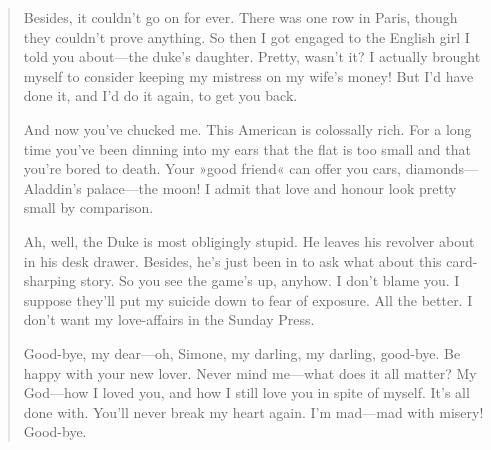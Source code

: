 \begin{quotation}
Besides, it couldn't go on for ever. There was one row in Paris, though they couldn't prove anything. So then I got engaged to the English girl I told you about—the duke's daughter. Pretty, wasn't it? I actually brought myself to consider keeping my mistress on my wife's money! But I'd have done it, and I'd do it again, to get you back.

And now you've chucked me. This American is colossally rich. For a long time you've been dinning into my ears that the flat is too small and that you're bored to death. Your »good friend« can offer you cars, diamonds—Aladdin's palace—the moon! I admit that love and honour look pretty small by comparison.

Ah, well, the Duke is most obligingly stupid. He leaves his revolver about in his desk drawer. Besides, he's just been in to ask what about this card-sharping story. So you see the game's up, anyhow. I don't blame you. I suppose they'll put my suicide down to fear of exposure. All the better. I don't want my love-affairs in the Sunday Press.

Good-bye, my dear—oh, Simone, my darling, my darling, good-bye. Be happy with your new lover. Never mind me—what does it all matter? My God—how I loved you, and how I still love you in spite of myself. It's all done with. You'll never break my heart again. I'm mad—mad with misery! Good-bye.

\end{quotation}